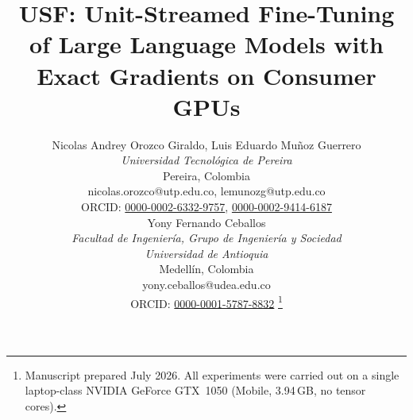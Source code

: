 \documentclass[journal]{IEEEtran}
\newcommand{\usf}{USF}
\begin{document}
\title{\usf{}: Unit-Streamed Fine-Tuning of Large Language Models with Exact Gradients on
Consumer GPUs}

\author{
Nicolas Andrey Orozco Giraldo, Luis Eduardo Muñoz Guerrero\\
\textit{Universidad Tecnológica de Pereira}\\
Pereira, Colombia\\
nicolas.orozco@utp.edu.co, lemunozg@utp.edu.co\\
ORCID: \href{https://orcid.org/0000-0002-6332-9757}{0000-0002-6332-9757},
\href{https://orcid.org/0000-0002-9414-6187}{0000-0002-9414-6187}\\[6pt]
Yony Fernando Ceballos\\
\textit{Facultad de Ingeniería, Grupo de Ingeniería y Sociedad}\\
\textit{Universidad de Antioquia}\\
Medellín, Colombia\\
yony.ceballos@udea.edu.co\\
ORCID: \href{https://orcid.org/0000-0001-5787-8832}{0000-0001-5787-8832}
\thanks{Manuscript prepared July 2026. All experiments were carried out on a single
laptop-class NVIDIA GeForce GTX~1050 (Mobile, 3.94\,GB, no tensor cores).}}

\maketitle
\end{document}
